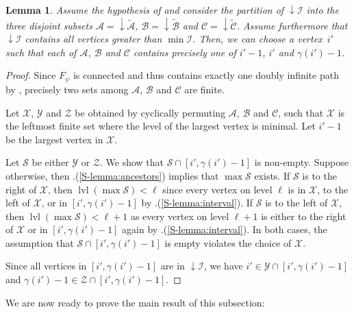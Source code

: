 \documentclass[a4paper]{amsart}
\newtheorem{lemma}[theorem]{Lemma}
\theoremstyle{definition}
\theoremstyle{remark}
\numberwithin{equation}{theorem}
\newcommand{\level}{\operatorname{lvl}}
\newcommand{\psiforest}{F_\psi}
\begin{document}
\begin{lemma}\label{lemma:larger-simple}
  Assume the hypothesis of  and consider
  the partition of $ \downarrow \! \mathcal I $ into the three disjoint
  subsets $\mathcal A = \downarrow \! \tilde{\mathcal A} $,
  $\mathcal B = \downarrow \! \tilde{\mathcal B} $ and
  $\mathcal C = \downarrow \! \tilde{\mathcal C} $.
  Assume furthermore that
  $ \downarrow \! \mathcal I $
  contains all vertices greater than $\min\mathcal I$.
    Then, we can choose a vertex~$i'$ such that each of $\mathcal A$,
  $\mathcal B$ and $\mathcal C$ contains precisely one of
 $i'-1$, $i'$
  and $\gamma(i')-1$.
\end{lemma}
\begin{proof}
  Since $\psiforest$ is connected and thus contains exactly one doubly infinite path by , precisely two sets among $\mathcal A$, $\mathcal B$ and $\mathcal C$ are finite.

  Let $\mathcal X$, $\mathcal Y$ and $\mathcal Z$ be obtained by
  cyclically permuting $\mathcal A$, $\mathcal B$ and $\mathcal C$,
  such that $\mathcal X$ is the
  leftmost finite set where the level
  of the largest vertex is minimal. Let $ i'-1 $ be the largest vertex in $ \mathcal X $.

  Let $\mathcal S$ be either $\mathcal Y$ or $\mathcal Z$.  We show that
  $\mathcal S\cap[i',\gamma(i')-1]$ is non-empty.  Suppose otherwise, then
  .(\ref{S-lemma:ancestors})
  implies that $\max\mathcal S$ exists.  If $\mathcal S$ is to
  the right of $\mathcal X$, then $\level(\max\mathcal S) < \ell$ since every vertex on level $ \ell $ is in $ \mathcal X $, to the left of $ \mathcal X $, or in $[i',\gamma(i')-1]$ by .(\ref{S-lemma:interval}). If
  $\mathcal S$ is to the left of $\mathcal X$, then $\level(\max\mathcal S)<\ell+1$ as every vertex on level $ \ell+1 $ is either to the right of $ \mathcal X $ or in $[i',\gamma(i')-1]$ again by .(\ref{S-lemma:interval}). In both cases, the assumption that $\mathcal S\cap[i',\gamma(i')-1]$ is empty violates the choice of $ \mathcal X $.

  Since all vertices in $[i',\gamma(i')-1]$ are in $\downarrow\!\mathcal I$, we have $i'\in \mathcal Y\cap[i',\gamma(i')-1]$ and
  $\gamma(i')-1\in\mathcal Z\cap[i',\gamma(i')-1]$.
\end{proof}


We are now ready to prove the main result of this subsection:
\end{document}
